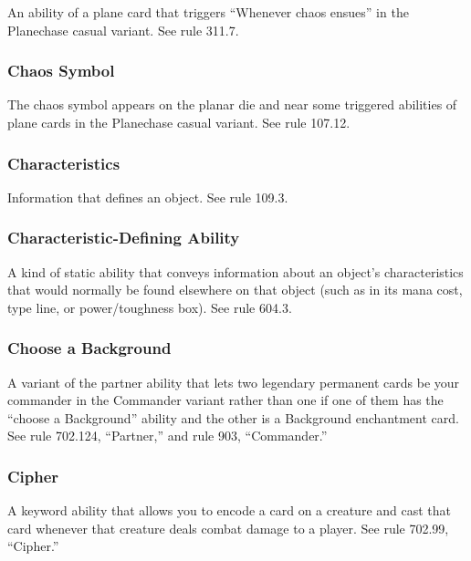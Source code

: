 {{{An ability of a plane card that triggers “Whenever chaos ensues” in the Planechase casual variant. See rule 311.7.

\subsubsection*{Chaos Symbol}

The chaos symbol appears on the planar die and near some triggered abilities of plane cards in the Planechase casual variant. See rule 107.12.

\subsubsection*{Characteristics}

Information that defines an object. See rule 109.3.

\subsubsection*{Characteristic-Defining Ability}

A kind of static ability that conveys information about an object’s characteristics that would normally be found elsewhere on that object (such as in its mana cost, type line, or power/toughness box). See rule 604.3.

\subsubsection*{Choose a Background}

A variant of the partner ability that lets two legendary permanent cards be your commander in the Commander variant rather than one if one of them has the “choose a Background” ability and the other is a Background enchantment card. See rule 702.124, “Partner,” and rule 903, “Commander.”

\subsubsection*{Cipher}

A keyword ability that allows you to encode a card on a creature and cast that card whenever that creature deals combat damage to a player. See rule 702.99, “Cipher.”

}}}
